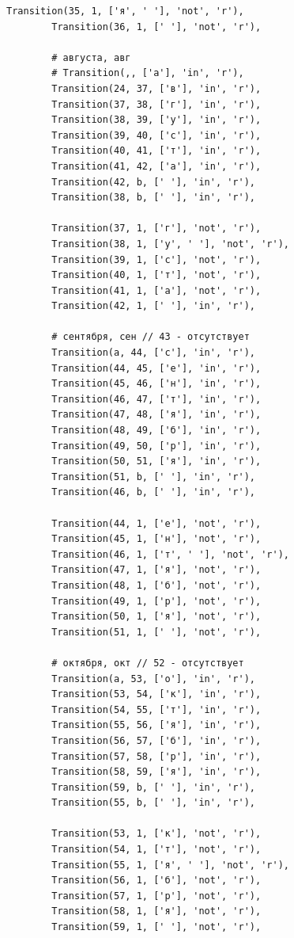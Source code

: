 \documentclass[a4paper, 14pt]{article}
\begin{document}
\begin{lstlisting}[label=some-code,caption=Автомат для поиска даты в текстовом формате]
        Transition(35, 1, ['я', ' '], 'not', 'r'),
        Transition(36, 1, [' '], 'not', 'r'),

        # августа, авг
        # Transition(,, ['а'], 'in', 'r'),
        Transition(24, 37, ['в'], 'in', 'r'),
        Transition(37, 38, ['г'], 'in', 'r'),
        Transition(38, 39, ['у'], 'in', 'r'),
        Transition(39, 40, ['с'], 'in', 'r'),
        Transition(40, 41, ['т'], 'in', 'r'),
        Transition(41, 42, ['а'], 'in', 'r'),
        Transition(42, b, [' '], 'in', 'r'),
        Transition(38, b, [' '], 'in', 'r'),

        Transition(37, 1, ['г'], 'not', 'r'),
        Transition(38, 1, ['у', ' '], 'not', 'r'),
        Transition(39, 1, ['с'], 'not', 'r'),
        Transition(40, 1, ['т'], 'not', 'r'),
        Transition(41, 1, ['а'], 'not', 'r'),
        Transition(42, 1, [' '], 'in', 'r'),

        # сентября, сен // 43 - отсутствует
        Transition(a, 44, ['с'], 'in', 'r'),
        Transition(44, 45, ['е'], 'in', 'r'),
        Transition(45, 46, ['н'], 'in', 'r'),
        Transition(46, 47, ['т'], 'in', 'r'),
        Transition(47, 48, ['я'], 'in', 'r'),
        Transition(48, 49, ['б'], 'in', 'r'),
        Transition(49, 50, ['р'], 'in', 'r'),
        Transition(50, 51, ['я'], 'in', 'r'),
        Transition(51, b, [' '], 'in', 'r'),
        Transition(46, b, [' '], 'in', 'r'),

        Transition(44, 1, ['е'], 'not', 'r'),
        Transition(45, 1, ['н'], 'not', 'r'),
        Transition(46, 1, ['т', ' '], 'not', 'r'),
        Transition(47, 1, ['я'], 'not', 'r'),
        Transition(48, 1, ['б'], 'not', 'r'),
        Transition(49, 1, ['р'], 'not', 'r'),
        Transition(50, 1, ['я'], 'not', 'r'),
        Transition(51, 1, [' '], 'not', 'r'),

        # октября, окт // 52 - отсутствует
        Transition(a, 53, ['о'], 'in', 'r'),
        Transition(53, 54, ['к'], 'in', 'r'),
        Transition(54, 55, ['т'], 'in', 'r'),
        Transition(55, 56, ['я'], 'in', 'r'),
        Transition(56, 57, ['б'], 'in', 'r'),
        Transition(57, 58, ['р'], 'in', 'r'),
        Transition(58, 59, ['я'], 'in', 'r'),
        Transition(59, b, [' '], 'in', 'r'),
        Transition(55, b, [' '], 'in', 'r'),

        Transition(53, 1, ['к'], 'not', 'r'),
        Transition(54, 1, ['т'], 'not', 'r'),
        Transition(55, 1, ['я', ' '], 'not', 'r'),
        Transition(56, 1, ['б'], 'not', 'r'),
        Transition(57, 1, ['р'], 'not', 'r'),
        Transition(58, 1, ['я'], 'not', 'r'),
        Transition(59, 1, [' '], 'not', 'r'),


\end{lstlisting}
\end{document}
